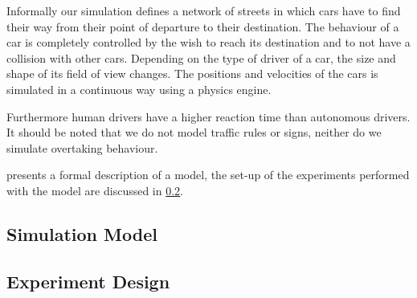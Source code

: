 Informally our simulation defines a network of streets in which cars have to find their way from their point of departure to their destination. The behaviour of a car is completely controlled by the wish to reach its destination and to not have a collision with other cars. Depending on the type of driver of a car, the size and shape of its field of view changes. The positions and velocities of the cars is simulated in a continuous way using a physics engine. 

Furthermore human drivers have a higher reaction time than autonomous drivers. It should be noted that we do not model traffic rules or signs, neither do we simulate overtaking behaviour.

 presents a formal description of a model, the set-up of the experiments performed with the model are discussed in \cref{sub:method:design}.

\subsection{Simulation Model}
\label{sub:method:model}



\subsection{Experiment Design}
\label{sub:method:design}
